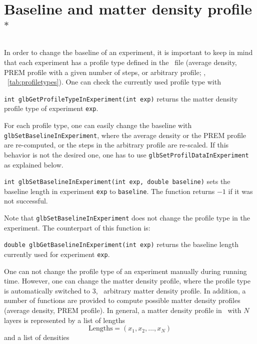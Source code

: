 \section{Baseline and matter density profile$^*$}
\label{sec:baselinemd}

In order to change the baseline of an experiment, it is important
to keep in mind that each experiment has a profile type defined
in the \AEDL\ file (average density, PREM profile with a given
number of steps, or arbitrary profile; \cf, \Tab~\ref{tab:profiletypes}). One can check the currently
used profile type with
\begin{function}
{\tt int glbGetProfileTypeInExperiment(int exp)} returns the matter density profile
type of experiment {\tt exp}.
\end{function}
For each profile type, one can easily change the baseline with {\tt glbSetBaselineInExperiment},
where the average density or the PREM profile are re-computed, or the
steps in the arbitrary profile are re-scaled. If this behavior is 
not the desired one, one has to use {\tt glbSetProfilDataInExperiment}
as explained below.
\begin{function}
{\tt int glbSetBaselineInExperiment(int exp, double baseline)}
sets the baseline length in experiment {\tt exp} to {\tt baseline}.
The function returns $-1$ if it was not successful.
\end{function}
Note that {\tt glbSetBaselineInExperiment} does not change the
profile type in the experiment. The counterpart of this function is:
\begin{function}
{\tt double glbGetBaselineInExperiment(int exp)} returns the
baseline length currently used for experiment {\tt exp}.
\end{function}
One can not change the profile type of an experiment manually
during running time. However, one can change the matter density
profile, where the profile type is automatically switched to 3, \ie\ 
arbitrary matter density profile. In addition, a number of functions 
are provided to compute possible matter density profiles (average density,
PREM profile). In general, a matter density profile in \GLOBES\ with
$N$ layers is represented by a list of lengths 
\begin{equation}
\mathrm{Lengths} = (x_1,x_2, \hdots, x_N) 
\end{equation}
and a list of densities
